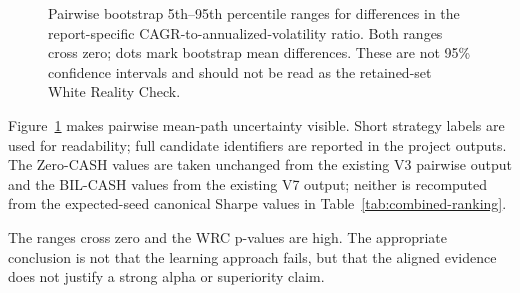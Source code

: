 \documentclass[11pt]{article}
\newcommand{\cashzero}{Zero-CASH}
\newcommand{\cashbil}{BIL-CASH}
\begin{document}
\begin{figure}[htbp]
\centering
{}
\caption{Pairwise bootstrap 5th--95th percentile ranges for differences in the report-specific CAGR-to-annualized-volatility ratio. Both ranges cross zero; dots mark bootstrap mean differences. These are not 95\% confidence intervals and should not be read as the retained-set White Reality Check.}
\label{fig:bootstrap-sharpe-ci}
\end{figure}

Figure~\ref{fig:bootstrap-sharpe-ci} makes pairwise mean-path uncertainty visible. Short strategy labels are used for readability; full candidate identifiers are reported in the project outputs. The \cashzero{} values are taken unchanged from the existing V3 pairwise output and the \cashbil{} values from the existing V7 output; neither is recomputed from the expected-seed canonical Sharpe values in Table~\ref{tab:combined-ranking}.

The ranges cross zero and the WRC p-values are high. The appropriate conclusion is not that the learning approach fails, but that the aligned evidence does not justify a strong alpha or superiority claim.
\end{document}
